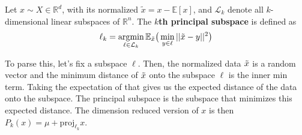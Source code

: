 \documentclass{article}
\DeclareMathOperator*{\argmin}{\arg\!\min}
\begin{document}
  \begin{definition}
    Let $x \sim X \in \mathbb{R}^d$, with its normalized $\tilde{x} = x - \mathbb{E}[x]$, and $\mathcal{L}_k$ denote all $k$-dimensional linear subspaces of $\mathbb{R}^n$. The \textbf{$k$th principal subspace} is defined as 
    \begin{equation}
      \ell_k = \argmin_{\ell \in \mathcal{L}_k} \mathbb{E}_{\Tilde{x}} \big( \min_{y \in \ell} ||\Tilde{x} - y||^2 \big)
    \end{equation}

    To parse this, let's fix a subspace $\ell$. Then, the normalized data $\Tilde{x}$ is a random vector and the minimum distance of $\Tilde{x}$ onto the subspace $\ell$ is the inner min term. Taking the expectation of that gives us the expected distance of the data onto the subspace. The principal subspace is the subspace that minimizes this expected distance. The dimension reduced version of $x$ is then $P_k (x) = \mu + \mathrm{proj}_{\ell_k} x$. 

    \begin{figure}[H]
      \centering
      \begin{subfigure}[b]{0.4\textwidth}
      \centering
\end{subfigure}
\end{figure}
\end{definition}
\end{document}
